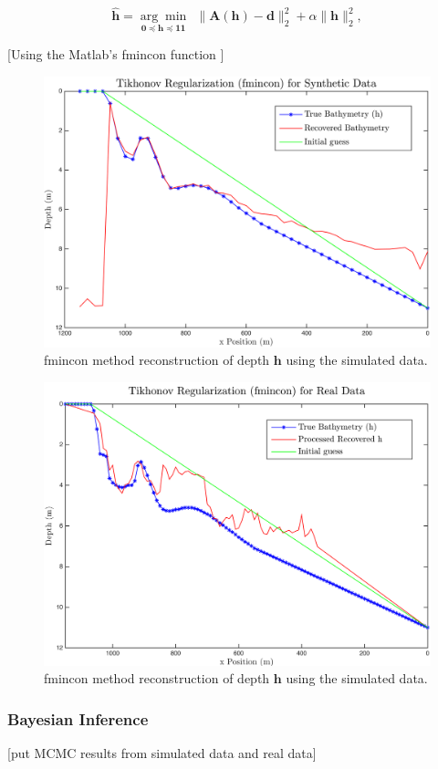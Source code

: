 \begin{equation}\label{LS-regBC}
\mathbf{\hat{h}} = \underset{\mathbf{0} \preceq \mathbf{h} \preceq \mathbf{11}}{\arg \min} \ \ \|  \mathbf{A}(\mathbf{h}) -  \mathbf{d} \|_2^2  +  \alpha \| \mathbf{h}\|_2^2,
\end{equation}

[Using the Matlab's fmincon function ]


\begin{figure}[H]
\center
\includegraphics[scale=0.46]{img/fmincon_simulated_25m.png} %
\caption{fmincon method reconstruction of depth $\mathbf{h}$ using the simulated data.}
\label{fmincon_simulated}
\end{figure}

\begin{figure}[H]
\center
\includegraphics[scale=0.46]{img/fmincon_real_data_oct09.png} %
\caption{fmincon method reconstruction of depth $\mathbf{h}$ using the simulated data.}
\label{fmincon_simulated}
\end{figure}




\subsubsection{Bayesian Inference}
[put MCMC results from simulated data and real data]